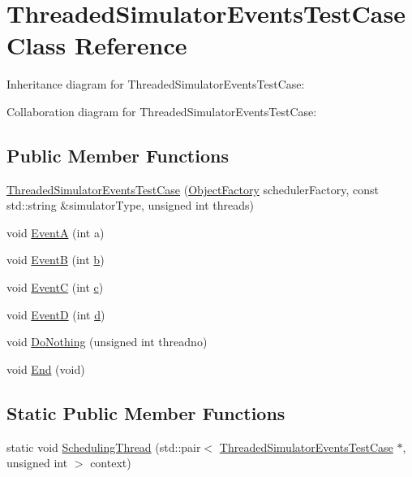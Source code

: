 \hypertarget{classThreadedSimulatorEventsTestCase}{}\section{Threaded\+Simulator\+Events\+Test\+Case Class Reference}
\label{classThreadedSimulatorEventsTestCase}


Inheritance diagram for Threaded\+Simulator\+Events\+Test\+Case\+:


Collaboration diagram for Threaded\+Simulator\+Events\+Test\+Case\+:
\subsection*{Public Member Functions}
\begin{DoxyCompactItemize}
\item 
\hyperlink{classThreadedSimulatorEventsTestCase_a274139cb979e3e2f1157499a2f093143}{Threaded\+Simulator\+Events\+Test\+Case} (\hyperlink{classns3_1_1ObjectFactory}{Object\+Factory} scheduler\+Factory, const std\+::string \&simulator\+Type, unsigned int threads)
\item 
void \hyperlink{classThreadedSimulatorEventsTestCase_a2134feb6de26f7f8e6c1abdd9e975897}{EventA} (int a)
\item 
void \hyperlink{classThreadedSimulatorEventsTestCase_a00cf24b2465f81fd61295eaad60ccd6e}{EventB} (int \hyperlink{lte__pathloss_8m_a21ad0bd836b90d08f4cf640b4c298e7c}{b})
\item 
void \hyperlink{classThreadedSimulatorEventsTestCase_a80533a87ccd3306fca8e0c3d031e9db0}{EventC} (int \hyperlink{mmwave_2model_2fading-traces_2fading__trace__generator_8m_ae0323a9039add2978bf5b49550572c7c}{c})
\item 
void \hyperlink{classThreadedSimulatorEventsTestCase_a7a2de9570600d8f21748df462baa860d}{EventD} (int \hyperlink{lte__pathloss_8m_a1aabac6d068eef6a7bad3fdf50a05cc8}{d})
\item 
void \hyperlink{classThreadedSimulatorEventsTestCase_af3b873916f2fa969ee56d36a58c29b79}{Do\+Nothing} (unsigned int threadno)
\item 
void \hyperlink{classThreadedSimulatorEventsTestCase_a6044a49276528c02fb347f61fe52c80d}{End} (void)
\end{DoxyCompactItemize}
\subsection*{Static Public Member Functions}
\begin{DoxyCompactItemize}
\item 
static void \hyperlink{classThreadedSimulatorEventsTestCase_a12c3b3a8dd71e643b4ef1f87d51004ad}{Scheduling\+Thread} (std\+::pair$<$ \hyperlink{classThreadedSimulatorEventsTestCase}{Threaded\+Simulator\+Events\+Test\+Case} $\ast$, unsigned int $>$ context)
\end{DoxyCompactItemize}
